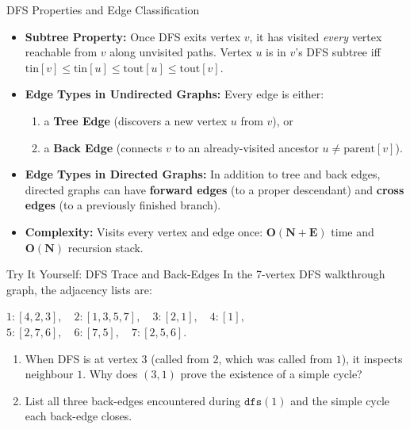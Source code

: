 \documentclass{beamer}
\begin{document}
\begin{frame}{DFS Properties and Edge Classification}
  \begin{itemize}
    \item \textbf{Subtree Property:} Once DFS exits vertex $v$, it has visited \emph{every} vertex reachable from $v$ along unvisited paths. Vertex $u$ is in $v$'s DFS subtree iff $\text{tin}[v] \le \text{tin}[u] \le \text{tout}[u] \le \text{tout}[v]$.
    \item \textbf{Edge Types in Undirected Graphs:} Every edge is either:
      \begin{enumerate}
        \item a \textbf{Tree Edge} (discovers a new vertex $u$ from $v$), or
        \item a \textbf{Back Edge} (connects $v$ to an already-visited ancestor $u \neq \text{parent}[v]$).
      \end{enumerate}
    \item \textbf{Edge Types in Directed Graphs:} In addition to tree and back edges, directed graphs can have \textbf{forward edges} (to a proper descendant) and \textbf{cross edges} (to a previously finished branch).
    \item \textbf{Complexity:} Visits every vertex and edge once: $\mathbf{O(N + E)}$ time and $\mathbf{O(N)}$ recursion stack.
  \end{itemize}
\end{frame}

\begin{frame}{Try It Yourself: DFS Trace and Back-Edges}
  In the 7-vertex DFS walkthrough graph, the adjacency lists are:
  \begin{center}
    {\small $1:[4,2,3],\quad 2:[1,3,5,7],\quad 3:[2,1],\quad 4:[1],$\\[2pt]
    $5:[2,7,6],\quad 6:[7,5],\quad 7:[2,5,6].$}
  \end{center}
  \begin{enumerate}
    \item When DFS is at vertex $3$ (called from $2$, which was called from $1$), it inspects neighbour $1$. Why does $(3, 1)$ prove the existence of a simple cycle?
    \item List all three back-edges encountered during $\texttt{dfs}(1)$ and the simple cycle each back-edge closes.
  \end{enumerate}
\end{frame}
\end{document}
